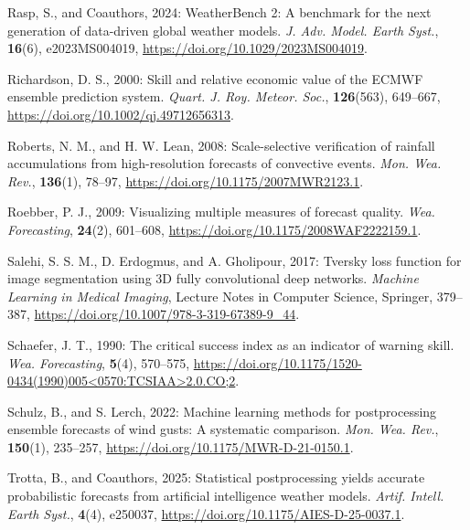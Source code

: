 \documentclass[12pt]{article}
\begin{document}
\begin{Exercises}
\item\hspace*{-6mm}
Rasp, S., and Coauthors, 2024: WeatherBench 2: A benchmark for the next generation of data-driven global weather models. \textit{J. Adv. Model. Earth Syst.}, \textbf{16}(6), e2023MS004019, \url{https://doi.org/10.1029/2023MS004019}.

\item\hspace*{-6mm}
Richardson, D. S., 2000: Skill and relative economic value of the ECMWF ensemble prediction system. \textit{Quart. J. Roy. Meteor. Soc.}, \textbf{126}(563), 649--667, \url{https://doi.org/10.1002/qj.49712656313}.

\item\hspace*{-6mm}
Roberts, N. M., and H. W. Lean, 2008: Scale-selective verification of rainfall accumulations from high-resolution forecasts of convective events. \textit{Mon. Wea. Rev.}, \textbf{136}(1), 78--97, \url{https://doi.org/10.1175/2007MWR2123.1}.

\item\hspace*{-6mm}
Roebber, P. J., 2009: Visualizing multiple measures of forecast quality. \textit{Wea. Forecasting}, \textbf{24}(2), 601--608, \url{https://doi.org/10.1175/2008WAF2222159.1}.

\item\hspace*{-6mm}
Salehi, S. S. M., D. Erdogmus, and A. Gholipour, 2017: Tversky loss function for image segmentation using 3D fully convolutional deep networks. \textit{Machine Learning in Medical Imaging}, Lecture Notes in Computer Science, Springer, 379--387, \url{https://doi.org/10.1007/978-3-319-67389-9_44}.

\item\hspace*{-6mm}
Schaefer, J. T., 1990: The critical success index as an indicator of warning skill. \textit{Wea. Forecasting}, \textbf{5}(4), 570--575, \url{https://doi.org/10.1175/1520-0434(1990)005<0570:TCSIAA>2.0.CO;2}.

\item\hspace*{-6mm}
Schulz, B., and S. Lerch, 2022: Machine learning methods for postprocessing ensemble forecasts of wind gusts: A systematic comparison. \textit{Mon. Wea. Rev.}, \textbf{150}(1), 235--257, \url{https://doi.org/10.1175/MWR-D-21-0150.1}.

\item\hspace*{-6mm}
Trotta, B., and Coauthors, 2025: Statistical postprocessing yields accurate probabilistic forecasts from artificial intelligence weather models. \textit{Artif. Intell. Earth Syst.}, \textbf{4}(4), e250037, \url{https://doi.org/10.1175/AIES-D-25-0037.1}.


\end{Exercises}
\end{document}
